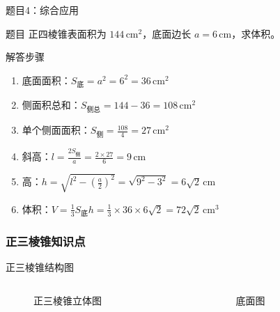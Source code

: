 \begin{frame}{题目4：综合应用}
  \begin{block}{题目}
      正四棱锥表面积为 \(144 \, \text{cm}^2\)，底面边长 \(a = 6 \, \text{cm}\)，求体积。
  \end{block}
  
  \pause
  
  \begin{alertblock}{解答步骤}
      \begin{enumerate}
          \item 底面面积：\( S_{\text{底}} = a^2 = 6^2 = 36 \, \text{cm}^2 \)
          \item 侧面积总和：\( S_{\text{侧总}} = 144 - 36 = 108 \, \text{cm}^2 \)
          \item 单个侧面面积：\( S_{\text{侧}} = \frac{108}{4} = 27 \, \text{cm}^2 \)
          \item 斜高：\( l = \frac{2 S_{\text{侧}}}{a} = \frac{2 \times 27}{6} = 9 \, \text{cm} \)
          \item 高：\( h = \sqrt{l^2 - \left(\frac{a}{2}\right)^2} = \sqrt{9^2 - 3^2} = 6\sqrt{2} \, \text{cm} \)
          \item 体积：\( V = \frac{1}{3} S_{\text{底}} h = \frac{1}{3} \times 36 \times 6\sqrt{2} = 72\sqrt{2} \, \text{cm}^3 \)
      \end{enumerate}
  \end{alertblock}
\end{frame}




\subsubsection{正三棱锥知识点}


\begin{frame}{正三棱锥结构图}

  \begin{minipage}[t][\textheight][t]{\textwidth}
    \centering
\begin{columns}
    \begin{column}{0.48\textwidth}
    \centering
    \begin{figure}
      \resizebox{!}{3cm}{ %
      
      }
      \caption{正三棱锥立体图}
\end{figure}

    \end{column}
    \hfill %
    \begin{column}{0.48\textwidth}
    \centering
    \begin{figure}
      \resizebox{!}{3cm}{ %
      }
      \caption{底面图}
    \end{figure}
    \end{column}
  \end{columns}
  \end{minipage}
  \end{frame}


